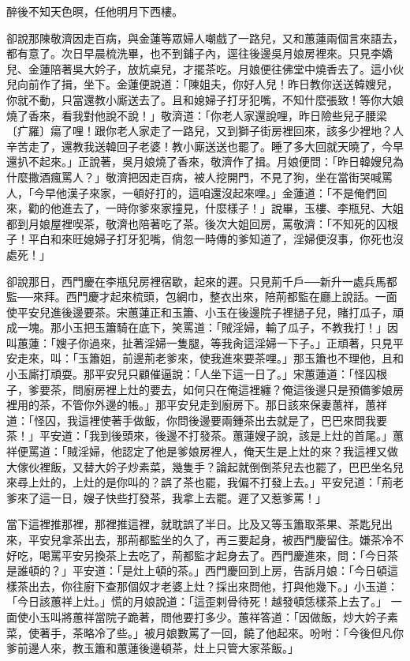 \begin{showcontents}{}
醉後不知天色暝，任他明月下西樓。

卻說那陳敬濟因走百病，與金蓮等眾婦人嘲戲了一路兒，又和蕙蓮兩個言來語去，都有意了。次日早晨梳洗畢，也不到鋪子內，逕往後邊吳月娘房裡來。只見李嬌兒、金蓮陪著吳大妗子，放炕桌兒，才擺茶吃。月娘便往佛堂中燒香去了。這小伙兒向前作了揖，坐下。金蓮便說道：「陳姐夫，你好人兒！昨日教你送送韓嫂兒，你就不動，只當還教小廝送去了。且和媳婦子打牙犯嘴，不知什麼張致！等你大娘燒了香來，看我對他說不說！」敬濟道：「你老人家還說哩，昨日險些兒子腰梁〔疒羅〕瘍了哩！跟你老人家走了一路兒，又到獅子街房裡回來，該多少裡地？人辛苦走了，還教我送韓回子老婆！教小廝送送也罷了。睡了多大回就天曉了，今早還扒不起來。」正說著，吳月娘燒了香來，敬濟作了揖。月娘便問：「昨日韓嫂兒為什麼撒酒瘋罵人？」敬濟把因走百病，被人挖開門，不見了狗，坐在當街哭喊罵人，「今早他漢子來家，一頓好打的，這咱還沒起來哩。」金蓮道：「不是俺們回來，勸的他進去了，一時你爹來家撞見，什麼樣子！」說畢，玉樓、李瓶兒、大姐都到月娘屋裡喫茶，敬濟也陪著吃了茶。後次大姐回房，罵敬濟：「不知死的囚根子！平白和來旺媳婦子打牙犯嘴，倘忽一時傳的爹知道了，淫婦便沒事，你死也沒處死！」

卻說那日，西門慶在李瓶兒房裡宿歇，起來的遲。只見荊千戶──新升一處兵馬都監──來拜。西門慶才起來梳頭，包網巾，整衣出來，陪荊都監在廳上說話。一面使平安兒進後邊要茶。宋蕙蓮正和玉簫、小玉在後邊院子裡撾子兒，賭打瓜子，頑成一塊。那小玉把玉簫騎在底下，笑罵道：「賊淫婦，輸了瓜子，不教我打！」因叫蕙蓮：「嫂子你過來，扯著淫婦一隻腿，等我肏這淫婦一下子。」正頑著，只見平安走來，叫：「玉簫姐，前邊荊老爹來，使我進來要茶哩。」那玉簫也不理他，且和小玉廝打頑耍。那平安兒只顧催逼說：「人坐下這一日了。」宋蕙蓮道：「怪囚根子，爹要茶，問廚房裡上灶的要去，如何只在俺這裡纏？俺這後邊只是預備爹娘房裡用的茶，不管你外邊的帳。」那平安兒走到廚房下。那日該來保妻蕙祥，蕙祥道：「怪囚，我這裡使著手做飯，你問後邊要兩鍾茶出去就是了，巴巴來問我要茶！」平安道：「我到後頭來，後邊不打發茶。蕙蓮嫂子說，該是上灶的首尾。」蕙祥便罵道：「賊淫婦，他認定了他是爹娘房裡人，俺天生是上灶的來？我這裡又做大傢伙裡飯，又替大妗子炒素菜，幾隻手？論起就倒倒茶兒去也罷了，巴巴坐名兒來尋上灶的，上灶的是你叫的？誤了茶也罷，我偏不打發上去。」平安兒道：「荊老爹來了這一日，嫂子快些打發茶，我拿上去罷。遲了又惹爹罵！」

當下這裡推那裡，那裡推這裡，就耽誤了半日。比及又等玉簫取茶果、茶匙兒出來，平安兒拿茶出去，那荊都監坐的久了，再三要起身，被西門慶留住。嫌茶冷不好吃，喝罵平安另換茶上去吃了，荊都監才起身去了。西門慶進來，問：「今日茶是誰頓的？」平安道：「是灶上頓的茶。」西門慶回到上房，告訴月娘：「今日頓這樣茶出去，你往廚下查那個奴才老婆上灶？採出來問他，打與他幾下。」小玉道：「今日該蕙祥上灶。」慌的月娘說道：「這歪剌骨待死！越發頓恁樣茶上去了。」 一面使小玉叫將蕙祥當院子跪著，問他要打多少。蕙祥答道：「因做飯，炒大妗子素菜，使著手，茶略冷了些。」被月娘數罵了一回，饒了他起來。吩咐：「今後但凡你爹前邊人來，教玉簫和蕙蓮後邊頓茶，灶上只管大家茶飯。」


\end{showcontents}
